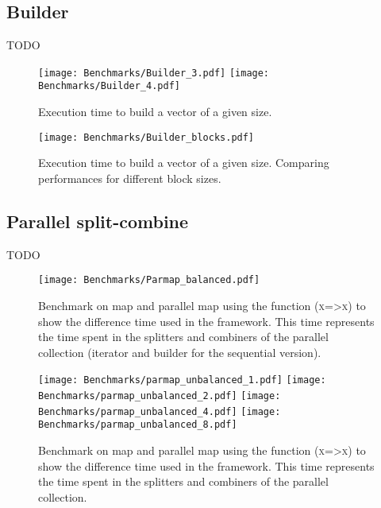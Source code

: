 \subsection{Builder}
\color{red} TODO \color{black}

\begin{figure}[h!]
  \centering
  \texttt{[image: Benchmarks/Builder\_3.pdf]}
  \texttt{[image: Benchmarks/Builder\_4.pdf]}
  \label{BuilderBenchmarks}
  \caption{Execution time to build a vector of a given size.}
\end{figure}

\begin{figure}[h!]
  \centering
  \texttt{[image: Benchmarks/Builder\_blocks.pdf]}
  \label{BuilderBlocksBenchmarks}
  \caption{Execution time to build a vector of a given size. Comparing performances for different block sizes.}
\end{figure}

\subsection{Parallel split-combine}
\color{red} TODO \color{black}

\begin{figure}[h!]
  \centering
  \texttt{[image: Benchmarks/Parmap\_balanced.pdf]}
  \label{ParallelBenchmarks}
  \caption{Benchmark on map and parallel map using the function (\textsc{x=>x}) to show the difference time used in the framework. This time represents the time spent in the splitters and combiners of the parallel collection (iterator and builder for the sequential version).}
\end{figure}

\begin{figure}[h!]
  \centering
  \texttt{[image: Benchmarks/parmap\_unbalanced\_1.pdf]}
  \texttt{[image: Benchmarks/parmap\_unbalanced\_2.pdf]}
  \texttt{[image: Benchmarks/parmap\_unbalanced\_4.pdf]}
  \texttt{[image: Benchmarks/parmap\_unbalanced\_8.pdf]}
  \label{ParallelUnbalancedBenchmarks}
  \caption{Benchmark on map and parallel map using the function (\textsc{x=>x}) to show the difference time used in the framework. This time represents the time spent in the splitters and combiners of the parallel collection.}
\end{figure}


